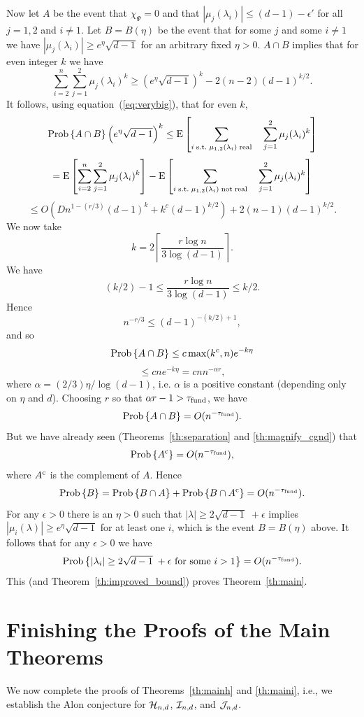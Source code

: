 \documentclass[12pt]{article}
\newcommand{\ch}{{\cal H}}
\newcommand{\ci}{{\cal I}}
\newcommand{\cj}{{\cal J}}
\newcommand{\cjnd}{\cj_{n,d}}
\newcommand{\cind}{\ci_{n,d}}
\newcommand{\chnd}{\ch_{n,d}}
\newcommand{\fund}{{\rm fund}}
\newcommand{\taufund}{{\tau_\fund}}
\newcommand{\tset}{{\Psi}}
\renewcommand{\complement}[1]{#1^{\rm c}}
\newcommand{\E}[1]{\mbox{E}\left[#1\right] }
\newcommand{\prob}[1]{{\rm Prob}\left\{ #1 \right\} }
\begin{document}
Now let $A$ be the event that $\chi_\tset=0$ and that
$|\mu_j(\lambda_i)|\le (d-1)-\epsilon'$
for all $j=1,2$ and $i\ne 1$.
Let $B=B(\eta)$ be the event that
for some $j$ and some $i\ne 1$ we have
$|\mu_j(\lambda_i)|\ge e^\eta\sqrt{d-1}$ for
an arbitrary fixed $\eta>0$.
$A\cap B$ implies that for even integer $k$ we have
$$
\sum_{i=2}^n\sum_{j=1}^2 
\mu_j(\lambda_i)^k \ge \left( e^\eta\sqrt{d-1}\right)^k - 2(n-2)(d-1)^{k/2}.
$$
It follows, using equation~(\ref{eq:verybig}), that for even $k$,
$$
\prob{ A\cap B } \left( e^\eta\sqrt{d-1}\right)^k \le
\E{ \sum_{i\;{\rm s.t.}\;\mu_{1,2}(\lambda_i)\;{\rm real}} \quad\sum_{j=1}^2 
\mu_j(\lambda_i)^k}
$$
$$
= \E{ \sum_{i=2}^n \sum_{j=1}^2 
\mu_j(\lambda_i)^k} -
\E{ \sum_{i\;{\rm s.t.}\;\mu_{1,2}(\lambda_i)\;{\rm not\;real}}\quad
\sum_{j=1}^2 
\mu_j(\lambda_i)^k}
$$
$$
\le O(Dn^{1-(r/3)}(d-1)^k+k^c(d-1)^{k/2}) + 2(n-1)(d-1)^{k/2}.
$$
We now take
$$
k = 2 \left\lceil \frac{r\log n}{3\log(d-1)} \right\rceil.
$$
We have
$$
(k/2)-1 \le  \frac{r\log n}{3\log(d-1)} \le k/2.
$$
Hence
$$
n^{-r/3}\le (d-1)^{-(k/2)+1},
$$
and so
$$
\prob{ A\cap B } \le
c\max(k^c,n) e^{-k\eta}
$$
$$
\le cn e^{-k\eta}
=cn n^{-\alpha r},
$$
where $\alpha=(2/3)\eta/\log(d-1)$, i.e. $\alpha$ is a positive constant
(depending only on $\eta$ and $d$).  Choosing $r$ so that
$\alpha r -1 > \taufund$, we have
$$
\prob{ A\cap B } = O(n^{-\taufund}).
$$
But we have already seen 
(Theorems~\ref{th:separation} and \ref{th:magnify_cgnd})
that
$$
\prob{ \complement A } = O(n^{-\taufund}),
$$
where $\complement A$ is the complement of $A$.
Hence
$$
\prob{ B} = \prob{B\cap A} + \prob{B\cap\complement A} = O(n^{-\taufund}).
$$
For any $\epsilon>0$ there is an $\eta>0$ such that $|\lambda|\ge
2\sqrt{d-1}\;+\epsilon$ implies $|\mu_i(\lambda)|\ge e^\eta\sqrt{d-1}$
for at least one $i$, which is the event
$B=B(\eta)$ above.  It follows that for any $\epsilon>0$ we have
$$
\prob{ \mbox{$|\lambda_i|\ge 2\sqrt{d-1}\;+\epsilon$ for some $i>1$}}
= O(n^{-\taufund}).
$$
This (and Theorem~\ref{th:improved_bound}) proves Theorem~\ref{th:main}.
\section{Finishing the Proofs of the Main Theorems}
\label{se:finish}

We now complete the proofs of Theorems~\ref{th:mainh}
and \ref{th:maini}, i.e., we establish the Alon
conjecture for $\chnd$, $\cind$, and $\cjnd$.
\end{document}
